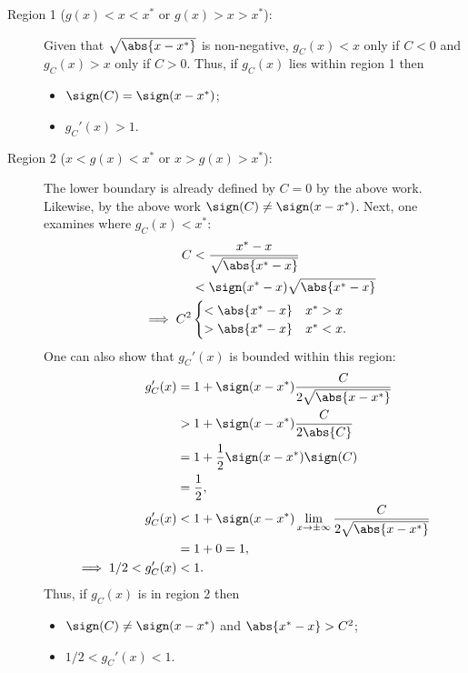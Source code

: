 \documentclass{article}
\begin{document}
\begin{description}
\item[Region 1 ($g(x) < x < x^*$ or $g(x) > x > x^*$):] Given that $\sqrt{\abs{x-x^*}}$ is non-negative, $g_C(x) < x$ only if $C < 0$ and $g_C(x) > x$ only if $C > 0$.
Thus, if $g_C(x)$ lies within region 1 then \begin{itemize}
\item $\sign(C) = \sign(x-x^*)$;
\item $g_C'(x) >1$.
\end{itemize}

\item[Region 2 ($x < g(x) < x^*$ or $x > g(x) > x^*$):] The lower boundary is already defined by $C=0$ by the above work.
Likewise, by the above work $\sign(C) \neq \sign(x-x^*)$.
Next, one examines where $g_C(x) < x^*$:
\begin{align*}
&&                          C & < \frac{x^* - x}{\sqrt{\abs{x^*-x}}} \\
&&                            & < \sign(x^*-x) \sqrt{\abs{x^*-x}} \\
&&  			 \implies C^2 & \begin{cases} < \abs{x^*-x} & x^* > x \\ > \abs{x^*-x} & x^* < x . \end{cases}
\end{align*}
One can also show that $g_C'(x)$ is bounded within this region:
\begin{align*}
g_C'(x) & = 1 + \sign(x-x^*) \frac{C}{2 \sqrt{\abs{x-x^*}}} \\
		& > 1 + \sign(x-x^*) \frac{C}{2 \abs{C}} \\
		& = 1 + \frac{1}{2} \sign(x-x^*) \sign(C) \\
		& = \frac{1}{2} , \\
g_C'(x) & < 1 + \sign(x-x^*) \lim_{x \to \pm \infty} \frac{C}{2 \sqrt{\abs{x-x^*}}} \\
		& = 1 + 0 = 1 , \\
\implies 1/2 < g_C'(x) & < 1 .
\end{align*}
Thus, if $g_C(x)$ is in region 2 then \begin{itemize}
\item $\sign(C) \neq \sign(x-x^*)$ and $\abs{x^*-x} > C^2$;
\item $1/2 < g_C'(x) < 1$.
\end{itemize}


\end{description}
\end{document}
